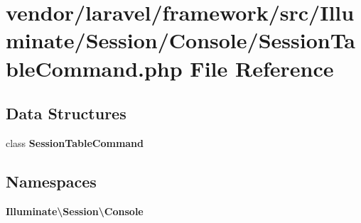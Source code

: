 \section{vendor/laravel/framework/src/\+Illuminate/\+Session/\+Console/\+Session\+Table\+Command.php File Reference}
\label{_session_table_command_8php}
\subsection*{Data Structures}
\begin{DoxyCompactItemize}
\item 
class {\bf Session\+Table\+Command}
\end{DoxyCompactItemize}
\subsection*{Namespaces}
\begin{DoxyCompactItemize}
\item 
 {\bf Illuminate\textbackslash{}\+Session\textbackslash{}\+Console}
\end{DoxyCompactItemize}
